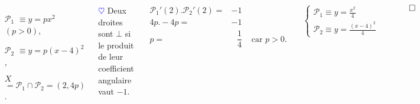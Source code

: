 \documentclass[10pt]{beamer}
\def \heart {\textcolor{blue}{$\heartsuit$} }
\begin{document}
{\begin{columns}[t]
		\begin{enumerate}

		\item[$\mathcal{P}_1$] $\equiv y=px^2$ $(p>0)$,
		\item[$\mathcal{P}_2$] $\equiv y=p(x-4)^2$,
		\item[$X$] $= \mathcal{P}_1 \cap \mathcal{P}_2 = (2,4p)$.
		\end{enumerate} \bigskip
		
		\heart Deux droites sont $\bot$ si le produit de leur coefficient angulaire vaut $-1$.
		 
	
		\begin{align*}
		\mathcal{P}_1'(2).\mathcal{P}_2'(2) =& -1& \\
		4p.-4p =& -1& \\
		p=& \text{ }\dfrac{1}{4} &\text{ car } p>0. \\ 
		\end{align*}
		
		$\begin{cases}\mathcal{P}_1\equiv y=\frac{x^2}{4} \\
			      \mathcal{P}_2\equiv y=\frac{(x-4)^2}{4}
		  \end{cases}$
		
		\hfill $\qed$
   
	   \end{columns}
  
  
	}
  
\end{document}
